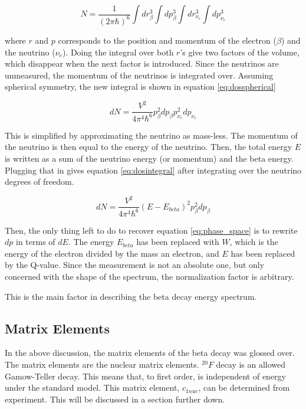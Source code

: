 \documentclass[main.tex]{subfiles}
\begin{document}
\begin{equation}
	N = \frac{1}{(2\pi\hbar)^{6}}\int dr^{3}_{\beta} \int dp^{3}_{\beta}\int dr^{3}_{\nu_{e}} \int dp^{3}_{\nu_{e}} 
	\label{eq:densityofstates}
\end{equation}

where $r$ and $p$ corresponds to the position and momentum of the electron ($\beta$) and the neutrino ($\nu_{e}$).
Doing the integral over both $r$'s give two factors of the volume, which disappear when the next factor is introduced.
Since the neutrinos are unmeasured, the momentum of the neutrinos is integrated over. 
Assuming spherical symmetry, the new integral is shown in equation \ref{eq:dosspherical}

\begin{equation}
	dN = \frac{V^{2}}{4\pi^{4}\hbar^{6}}p_{\beta}^{2}dp_{\beta}p_{\nu_{e}}^{2}dp_{\nu_{e}}
	\label{eq:dosspherical}
\end{equation}

This is simplified by approximating the neutrino as mass-less.
The momentum of the neutrino is then equal to the energy of the neutrino.
Then, the total energy $E$ is written as a sum of the neutrino energy (or momentum) and the beta energy.
Plugging that in gives equation \ref{eq:dosintegral} after integrating over the neutrino degrees of freedom. 

\begin{equation}
	dN = \frac{V^{2}}{4\pi^{4}\hbar^{6}}(E - E_{beta})^{2}p_{\beta}^{2}dp_{\beta}
	\label{eq:dosintegral}
\end{equation}

Then, the only thing left to do to recover equation \ref{eq:phase_space} is to rewrite $dp$ in terms of $dE$. 
The energy $E_{beta}$ has been replaced with $W$, which is the energy of the electron divided by the mass an electron, and $E$ has been replaced by the Q-value.
Since the measurement is not an absolute one, but only concerned with the shape of the spectrum, the normalization factor is arbitrary.

This is the main factor in describing the beta decay energy spectrum.

\subsection{Matrix Elements}
In the above discussion, the matrix elements of the beta decay was glossed over.
The matrix elements are the nuclear matrix elements.
$^{20}F$ decay is an allowed Gamow-Teller decay.
This means that, to first order, is independent of energy under the standard model.
This matrix element, $c_{1nuc}$, can be determined from experiment.
This will be discussed in a section further down.
\end{document}
